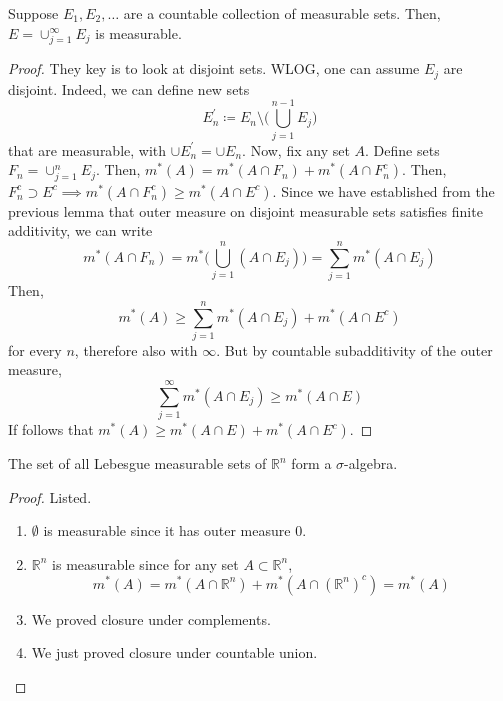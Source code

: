   \begin{theorem}
    Suppose $E_1, E_2, \ldots$ are a countable collection of measurable sets. Then, $E = \cup_{j=1}^\infty E_j$ is measurable. 
  \end{theorem}
  \begin{proof}
    They key is to look at disjoint sets. WLOG, one can assume $E_j$ are disjoint. Indeed, we can define new sets
    \begin{equation}
      E_n^\prime \coloneqq E_n \setminus \bigg( \bigcup_{j=1}^{n-1} E_j \bigg) 
    \end{equation}
    that are measurable, with $\cup E_n^\prime = \cup E_n$. Now, fix any set $A$. Define sets $F_n = \cup_{j=1}^n E_j$. Then, $m^\ast (A) = m^\ast (A \cap F_n) + m^\ast (A \cap F_n^c)$. Then, $F_n^c \supset E^c \implies m^\ast (A \cap F_n^c) \geq m^\ast (A \cap E^c)$. Since we have established from the previous lemma that outer measure on disjoint measurable sets satisfies finite additivity, we can write
    \begin{equation}
      m^\ast (A \cap F_n) = m^\ast \bigg( \bigcup_{j=1}^n (A \cap E_j) \bigg) = \sum_{j=1}^n m^\ast (A \cap E_j) 
    \end{equation}
    Then, 
    \begin{equation}
      m^\ast (A) \geq \sum_{j=1}^n m^\ast (A \cap E_j) + m^\ast (A \cap E^c) 
    \end{equation}
    for every $n$, therefore also with $\infty$. But by countable subadditivity of the outer measure, 
    \begin{equation}
      \sum_{j=1}^\infty m^\ast (A \cap E_j) \geq m^\ast (A \cap E)
    \end{equation}
    If follows that $m^\ast (A) \geq m^\ast (A \cap E) + m^\ast (A \cap E^c)$. 
  \end{proof}

  \begin{corollary}
    The set of all Lebesgue measurable sets of $\mathbb{R}^n$ form a $\sigma$-algebra. 
  \end{corollary}
  \begin{proof}
    Listed. 
    \begin{enumerate}
      \item $\emptyset$ is measurable since it has outer measure $0$. 
      \item $\mathbb{R}^n$ is measurable since for any set $A \subset \mathbb{R}^n$, 
      \begin{equation}
        m^\ast (A) = m^\ast(A \cap \mathbb{R}^n) + m^\ast(A \cap (\mathbb{R}^n)^c) = m^\ast(A) 
      \end{equation}
      \item We proved closure under complements. 
      \item We just proved closure under countable union. 
    \end{enumerate}
  \end{proof}


